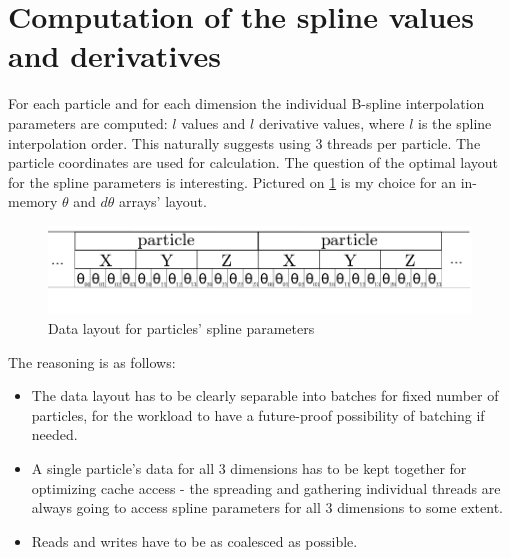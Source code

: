 \documentclass[12pt,a4paper]{report}
\newcommand{\draft}[1]{#1}
\begin{document}
\section{Computation of the spline values and derivatives}
For each particle and for each dimension the individual B-spline interpolation parameters are computed: $l$ values and $l$ derivative values, where $l$ is the spline interpolation order. This naturally suggests using 3 threads per particle. The particle coordinates are used for calculation.
The question of the optimal layout for the spline parameters is interesting. Pictured on \ref{fig:spline} is my choice for an in-memory $\theta$ and $d\theta$ arrays' layout. 
\FloatBarrier
\begin{figure}[h!]
    \centering
    \includegraphics[width=1\textwidth]{pics/theta.png}
    \caption{Data layout for particles' spline parameters}
    \label{fig:spline}
\end{figure}
\FloatBarrier
The reasoning is as follows:
\begin{itemize}
\item The data layout has to be clearly separable into batches for fixed number of particles, for the workload to have a future-proof possibility of batching if needed.
\item A single particle's data for all 3 dimensions has to be kept together for optimizing cache access - the spreading and gathering individual threads are always going to access spline parameters for all 3 dimensions to some extent. 
\item Reads and writes have to be as coalesced as possible.
\end{itemize}
\end{document}
